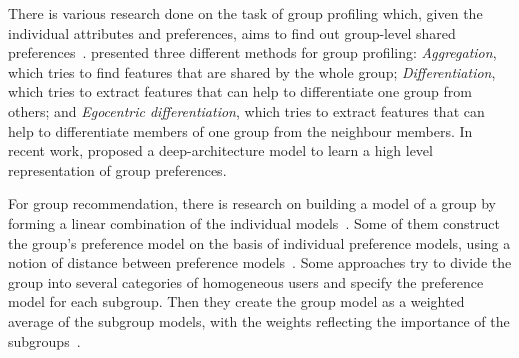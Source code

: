 There is various research done on the task of group profiling which, given the individual attributes and preferences, aims to find out group-level shared preferences~\cite{Senot:2011,Masthoff:2011}.
\citet{Tang:2011} presented three different methods for group profiling: \textsl{Aggregation}, which tries to find features that are shared by the whole group; \textsl{Differentiation}, which tries to extract features that can help to differentiate one group from others; and \textsl{Egocentric differentiation}, which tries to extract features that can help to differentiate members of one group from the neighbour members. In recent work, \citet{Hu:2014} proposed a deep-architecture model to learn a high level representation of group preferences.

For group recommendation,  there is research on building a model of a group by forming a linear combination of the individual models~\citep{Jameson:2007}. Some of them construct the group's preference model on the basis of individual preference models, using a notion of distance between preference models~\citep{Yu:2006}. Some approaches try to divide the group into several categories of homogeneous users and specify the preference model for each subgroup. Then they create the group model as a weighted average of the subgroup models, with the weights reflecting the importance of the subgroups~\citep{Ardissono:2003}.
